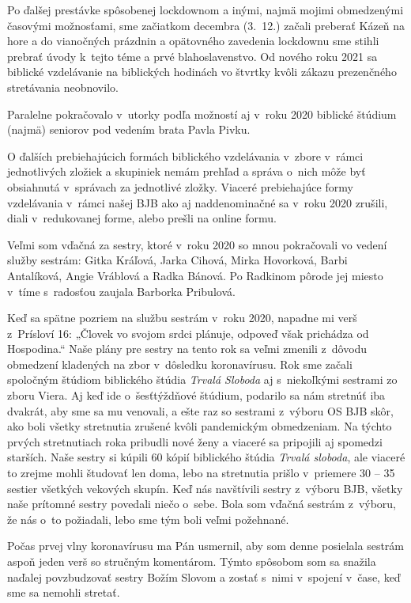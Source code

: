Po ďalšej prestávke spôsobenej lockdownom a inými, najmä mojimi obmedzenými časovými možnosťami, sme začiatkom decembra (3.~12.) začali preberať Kázeň na hore a do vianočných prázdnin a opätovného zavedenia lockdownu sme stihli prebrať úvody k~tejto téme a prvé blahoslavenstvo. Od nového roku 2021 sa biblické vzdelávanie na biblických hodinách vo štvrtky kvôli zákazu prezenčného stretávania neobnovilo.

Paralelne pokračovalo v~utorky podľa možností aj v~roku 2020 biblické štúdium (najmä) seniorov pod vedením brata Pavla Pivku.

O ďalších prebiehajúcich formách biblického vzdelávania v~zbore v~rámci jednotlivých zložiek a skupiniek nemám prehľad a správa o~nich môže byť obsiahnutá v~správach za jednotlivé zložky. Viaceré prebiehajúce formy vzdelávania v~rámci našej BJB ako aj naddenominačné sa v~roku 2020 zrušili, diali v~redukovanej forme, alebo prešli na online formu.



Veľmi som vďačná za sestry, ktoré v~roku 2020 so mnou pokračovali vo vedení služby sestrám: Gitka Kráľová, Jarka Cihová, Mirka Hovorková, Barbi Antalíková, Angie Vráblová a Radka Bánová. Po Radkinom pôrode jej miesto v~tíme s~radosťou zaujala Barborka Pribulová.

Keď sa spätne pozriem na službu sestrám v~roku 2020, napadne mi verš z~Prísloví 16: „Človek vo svojom srdci plánuje, odpoveď však prichádza od Hospodina.“ Naše plány pre sestry na tento rok sa veľmi zmenili z~dôvodu obmedzení kladených na zbor v~dôsledku koronavírusu. Rok sme začali spoločným štúdiom biblického štúdia {\it Trvalá Sloboda} aj s~niekoľkými sestrami zo zboru Viera. Aj keď ide o~šesťtýždňové štúdium, podarilo sa nám stretnúť iba dvakrát, aby sme sa mu venovali, a ešte raz so sestrami z~výboru OS BJB skôr, ako boli všetky stretnutia zrušené kvôli pandemickým obmedzeniam. Na týchto prvých stretnutiach roka pribudli nové ženy a viaceré sa pripojili aj spomedzi starších. Naše sestry si kúpili 60 kópií biblického štúdia {\it Trvalá sloboda}, ale viaceré to zrejme mohli študovať len doma, lebo na stretnutia prišlo v~priemere 30 -- 35 sestier všetkých vekových skupín. Keď nás navštívili sestry z~výboru BJB, všetky naše prítomné sestry povedali niečo o~sebe. Bola som vďačná sestrám z~výboru, že nás o~to požiadali, lebo sme tým boli veľmi požehnané.

Počas prvej vlny koronavírusu ma Pán usmernil, aby som denne posielala sestrám aspoň jeden verš so stručným komentárom. Týmto spôsobom som sa snažila naďalej povzbudzovať sestry Božím Slovom a zostať s~nimi v~spojení v~čase, keď sme sa nemohli stretať.

